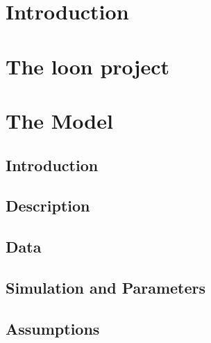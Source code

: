 \documentclass[A4,openany,12pt]{article}
\begin{document}
\onehalfspacing



\tableofcontents 
\thispagestyle{empty}
\listoftables
\thispagestyle{empty}
\listoffigures
\thispagestyle{empty}
\printnomenclature
\thispagestyle{empty}
\cleardoublepage
{}



\section{Introduction}
%

\section{The loon project}
%

\section{The Model}\label{theModel}

\subsection{Introduction}\label{theModel_intro}



\subsection{Description}\label{theModel_description}


\subsection{Data}\label{theModel_data}




\subsection{Simulation and Parameters}\label{theModel_snp}



\subsection{Assumptions}
%
\end{document}
